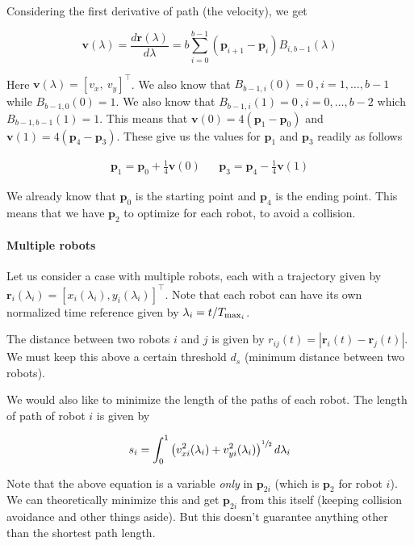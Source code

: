 Considering the first derivative of path (the velocity), we get

\begin{equation}
    \mathbf{v}(\lambda) = \frac{d \mathbf{r}(\lambda)}{d \lambda} = b \sum_{i = 0}^{b-1} \left ( \mathbf{p}_{i+1} - \mathbf{p}_i \right ) B_{i, b-1} (\lambda)
\end{equation}

Here $\mathbf{v}(\lambda) = [v_x,\:v_y]^\top$. We also know that $B_{b-1, i}(0) = 0 \:, i = 1, \dots, b-1$ while $B_{b-1, 0}(0) = 1$. We also know that $B_{b-1, i}(1) = 0 \:, i = 0, \dots, b-2$ which $B_{b-1, b-1}(1) = 1$.
This means that $\mathbf{v}(0) = 4(\mathbf{p}_1 - \mathbf{p}_0)$ and $\mathbf{v}(1) = 4(\mathbf{p}_4 - \mathbf{p}_3)$. 
These give us the values for $\mathbf{p}_1$ and $\mathbf{p}_3$ readily as follows

\begin{align}
    \mathbf{p}_1 = \mathbf{p}_0 + \frac{1}{4} \mathbf{v}(0) &&
    \mathbf{p}_3 = \mathbf{p}_4 - \frac{1}{4} \mathbf{v}(1)
\end{align}

We already know that $\mathbf{p}_0$ is the starting point and $\mathbf{p}_4$ is the ending point. This means that we have $\mathbf{p}_2$ to optimize for each robot, to avoid a collision.

\paragraph{Multiple robots}

Let us consider a case with multiple robots, each with a trajectory given by $\mathbf{r}_i(\lambda_i) = \left[ x_i(\lambda_i), y_i(\lambda_i) \right]^\top$. Note that each robot can have its own normalized time reference given by $\lambda_i = t/T_{\textup{max}_i}$.

The distance between two robots $i$ and $j$ is given by $r_{ij}(t) = |\mathbf{r}_i(t) - \mathbf{r}_j(t)|$. We must keep this above a certain threshold $d_s$ (minimum distance between two robots).

We would also like to minimize the length of the paths of each robot. The length of path of robot $i$ is given by

\begin{equation}
    s_i = \int_0^1 \left ( v_{xi}^2 (\lambda_i) + v_{yi}^2 (\lambda_i) \right )^{\sfrac{1}{2}} d\lambda_i
\end{equation}

Note that the above equation is a variable \emph{only} in $\mathbf{p}_{2i}$ (which is $\mathbf{p}_2$ for robot $i$). We can theoretically minimize this and get $\mathbf{p}_{2i}$ from this itself (keeping collision avoidance and other things aside). But this doesn't guarantee anything other than the shortest path length.

